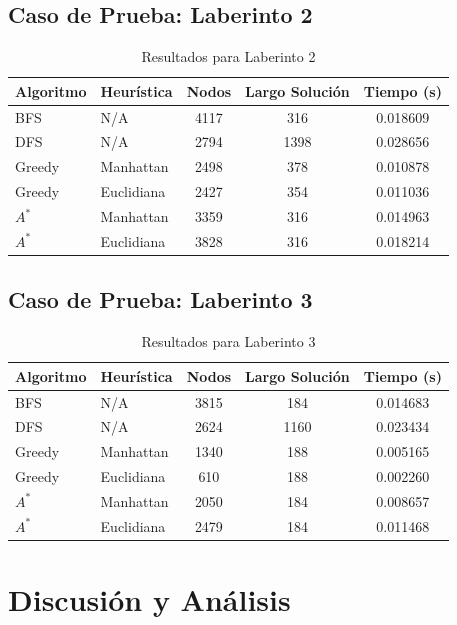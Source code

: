 \documentclass[12pt,a4paper]{article}
\begin{document}
\subsection{Caso de Prueba: Laberinto 2}
\begin{table}[h]
\centering
\begin{tabular}{llccc}
\toprule
\textbf{Algoritmo} & \textbf{Heurística} & \textbf{Nodos} & \textbf{Largo Solución} & \textbf{Tiempo (s)} \\
\midrule
BFS & N/A & 4117 & 316 & 0.018609 \\
DFS & N/A & 2794 & 1398 & 0.028656  \\
Greedy & Manhattan & 2498 & 378 & 0.010878  \\
Greedy & Euclidiana & 2427 & 354 & 0.011036 \\
$A^*$ & Manhattan & 3359 & 316 & 0.014963  \\
$A^*$ & Euclidiana & 3828 & 316 & 0.018214  \\
\bottomrule
\end{tabular}
\caption{Resultados para Laberinto 2}
\end{table}

\newpage 

\subsection{Caso de Prueba: Laberinto 3}
\begin{table}[h]
\centering
\begin{tabular}{llccc}
\toprule
\textbf{Algoritmo} & \textbf{Heurística} & \textbf{Nodos} & \textbf{Largo Solución} & \textbf{Tiempo (s)} \\
\midrule
BFS & N/A & 3815 & 184 & 0.014683  \\
DFS & N/A & 2624 & 1160 & 0.023434  \\
Greedy & Manhattan & 1340 & 188 & 0.005165  \\
Greedy & Euclidiana & 610 & 188 & 0.002260 \\
$A^*$ & Manhattan & 2050 & 184 & 0.008657  \\
$A^*$ & Euclidiana & 2479 & 184 & 0.011468  \\
\bottomrule
\end{tabular}
\caption{Resultados para Laberinto 3}
\end{table}

\section{Discusión y Análisis}
\end{document}
